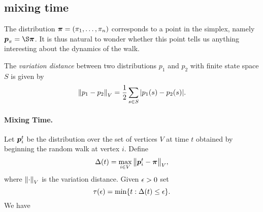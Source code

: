 \subsection{mixing time}
The distribution $\boldsymbol{\pi}=(\pi_1,\dots,\pi_n)$ corresponds to a point in the simplex, namely $\p_\pi=\S\bpi$. It is thus natural to wonder whether this point tells us anything interesting about the dynamics of the walk. 

The \emph{variation distance} between two distributions $p_1$ and $p_2$ with finite state space $S$ is given by 
\[\norm{p_1-p_2}_V = \frac{1}{2}\sum_{s\in S} |p_1(s)-p_2(s)|.\]

\paragraph{Mixing Time.} Let $\vb*{p}_i^t$ be the distribution over the set of vertices $V$ at time $t$ obtained by beginning the random walk at vertex $i$. Define 
\[\Delta(t) = \max_{i\in V}\norm{\vb*{p}_i^t-\boldsymbol{\pi}}_V,\]
where $\norm{\cdot}_V$ is the variation distance. Given $\epsilon>0$ set 
\[\tau(\epsilon) = \min\{t:\Delta(t)\leq \epsilon\}.\]
We have 
